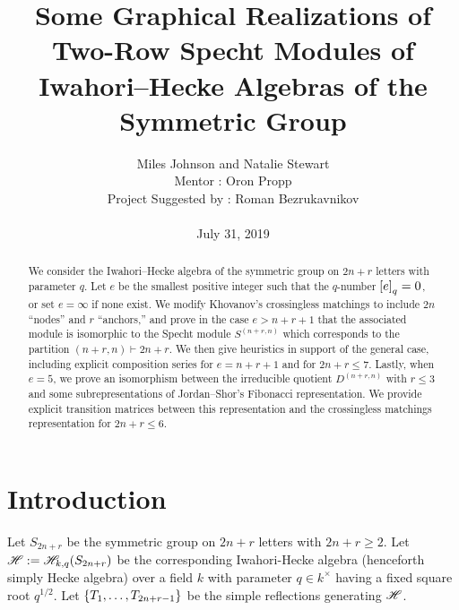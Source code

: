 \documentclass{amsart}
\begin{document}
  \title[Some Graphical Realizations of Two-Row Specht Modules of Hecke Algebras]{Some Graphical Realizations of Two-Row Specht Modules of Iwahori--Hecke Algebras of the Symmetric Group}
  \author[Miles Johnson and Natalie Stewart]{Miles Johnson and Natalie Stewart\\
    Mentor : Oron Propp\\
  Project Suggested by : Roman Bezrukavnikov\\ \; \\
  July 31, 2019
  }

   \begin{titlepage}
    \maketitle
    \begin{abstract}
      We consider the Iwahori--Hecke algebra of the symmetric group on $2n + r$ letters with parameter $q$.
      Let $e$ be the smallest positive integer such that the $q$-number $\left[ e \right]_q = 0$, or set $e = \infty$ if none exist.
      We modify Khovanov's crossingless matchings to include $2n$ ``nodes'' and $r$ ``anchors,'' and prove in the case $e > n + r + 1$ that the associated module is isomorphic to the Specht module $S^{(n+r,n)}$ which corresponds to the partition $(n + r,n) \vdash 2n + r$.
      We then give heuristics in support of the general case, including explicit composition series for $e = n + r + 1$ and for $2n + r \leq 7$. 
      Lastly, when $e = 5$, we prove an isomorphism between the irreducible quotient $D^{(n+r,n)}$ with $r \leq 3$ and some subrepresentations of Jordan--Shor's Fibonacci representation.
      We provide explicit transition matrices between this representation and the crossingless matchings representation for $2n + r \leq 6$.
    \end{abstract}

  \begingroup
  \hypersetup{linkcolor=black} %
  \tableofcontents
  \endgroup

  \end{titlepage}

\section{Introduction} 
  Let $S_{2n+r}$ be the symmetric group on $2n+r$ letters with $2n + r \geq 2$.
  Let $\mathscr{H} := \mathscr{H}_{k,q}(S_{2n+r})$ be the corresponding Iwahori-Hecke algebra (henceforth simply Hecke algebra) over a field $k$ with parameter $q \in k^\times$ having a fixed square root $q^{1/2}$.
  Let $\left\{ T_1,\dots,T_{2n + r - 1} \right\}$ be the simple reflections generating $\mathscr{H}$.
   
\end{document}
